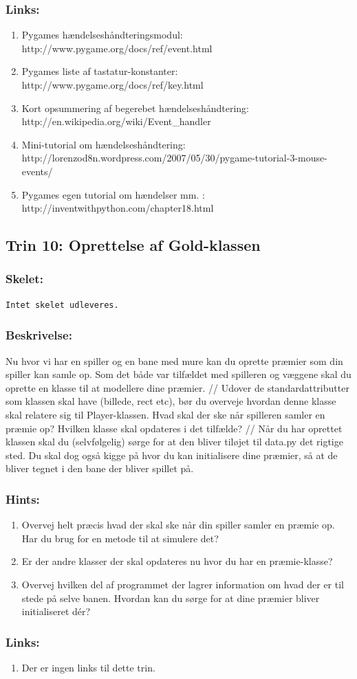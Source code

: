 \documentclass[10pt,a4paper,danish]{article}
\begin{document}
\subsubsection{Links:}
\begin{enumerate}
\item Pygames hændelseshåndteringsmodul: http://www.pygame.org/docs/ref/event.html
\item Pygames liste af tastatur-konstanter: http://www.pygame.org/docs/ref/key.html
\item Kort opsummering af begerebet hændelseshåndtering: http://en.wikipedia.org/wiki/Event\_handler
\item Mini-tutorial om hændelseshåndtering: http://lorenzod8n.wordpress.com/2007/05/30/pygame-tutorial-3-mouse-events/
\item Pygames egen tutorial om hændelser mm. : http://inventwithpython.com/chapter18.html
\end{enumerate}

\subsection{Trin 10: Oprettelse af Gold-klassen}
\subsubsection{Skelet:} 
\begin{verbatim}
Intet skelet udleveres. 
\end{verbatim}
\subsubsection{Beskrivelse:}
Nu hvor vi har en spiller og en bane med mure kan du 
oprette præmier som din spiller kan samle op. Som det 
både var tilfældet med spilleren og væggene skal du
oprette en klasse til at modellere dine præmier. 
//
Udover de standardattributter som klassen skal have
(billede, rect etc), bør du overveje hvordan denne 
klasse skal relatere sig til Player-klassen. Hvad skal 
der ske når spilleren samler en præmie op? Hvilken 
klasse skal opdateres i det tilfælde?
//
Når du har oprettet klassen skal du (selvfølgelig)
sørge for at den bliver tiløjet til data.py det
rigtige sted. Du skal dog også kigge på hvor du
kan initialisere dine præmier, så at de bliver
tegnet i den bane der bliver spillet på.  

\subsubsection{Hints:}
\begin{enumerate}
\item Overvej helt præcis hvad der skal ske
når din spiller samler en præmie op. Har du
brug for en metode til at simulere det?
\item Er der andre klasser der skal opdateres
nu hvor du har en præmie-klasse?
\item Overvej hvilken del af programmet der 
lagrer information om hvad der er til stede 
på selve banen. Hvordan kan du sørge for at
dine præmier bliver initialiseret dér?
\end{enumerate}
\subsubsection{Links:}
\begin{enumerate}
\item Der er ingen links til dette trin. 
\end{enumerate}
\end{document}

